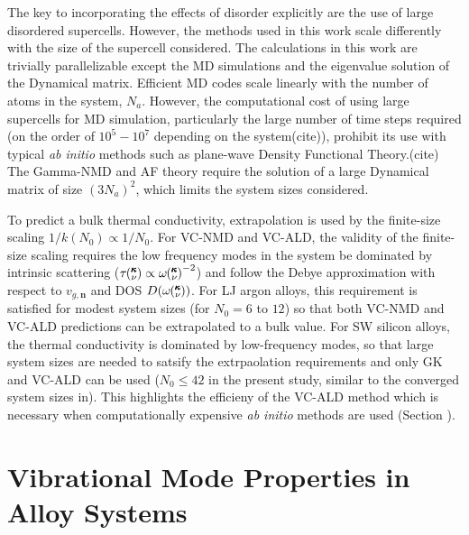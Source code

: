 \documentclass[aps,prb,onecolumn,preprint,superscriptaddress,amsmath,amssymb,floatfix]{revtex4}
\newcommand{\kv}{\mspace{-4.0mu}\left(\mspace{-8.0mu}
\begin{smallmatrix}&\pmb{\kappa} \\&\nu\end{smallmatrix}
\mspace{-3.0mu}\right)}
\begin{document}
The key to incorporating the effects of disorder explicitly are the use 
of large disordered supercells. 
However, the methods used 
in this work scale differently with the size of the supercell considered. 
The calculations in this work are trivially parallelizable\cite{} 
except the 
MD simulations\cite{plimpton_fast_1995} and the eigenvalue solution of the 
Dynamical matrix.\cite{gale_general_2003} Efficient MD 
codes scale linearly with the number of atoms in the system, $N_a$.  
However, the computational cost of using large supercells for MD simulation, 
particularly the large number of time steps required 
(on the order of $10^5 - 10^7$ depending on the 
system(cite)), prohibit its use with typical 
\emph{ab initio} methods such as 
plane-wave Density Functional Theory.(cite) The Gamma-NMD and AF theory 
require the solution of a large Dynamical matrix of size 
$(3N_a)^2$, which limits the system sizes considered. 

To predict a bulk thermal conductivity, extrapolation is used by the 
finite-size scaling $ 1 / k(N_0) \propto 1/N_0$. For VC-NMD and 
VC-ALD, the validity of the finite-size scaling 
requires the low frequency modes in the system be dominated by 
intrinsic scattering ($\tau\kv \propto \omega\kv^{-2}$) and  
follow the Debye approximation 
with respect to $v_{g,\mathbf{n}}$ and DOS $D(\omega\kv)$.
\cite{shiomi_thermal_2011,esfarjani_heat_2011} For LJ 
argon alloys, this requirement is satisfied for modest system sizes 
(for $N_0 = 6$ to $12$) so that both VC-NMD and VC-ALD predictions 
can be extrapolated to a bulk value. 
For SW silicon alloys, the thermal conductivity is dominated by low-frequency 
modes, so that large system sizes are needed to satsify the 
extrpaolation requirements and only GK and VC-ALD can be used 
($N_0 \le 42$ in the present study, 
similar to the converged system sizes in\cite{he_lattice_2012}). This 
highlights the efficieny of the VC-ALD method which is 
necessary when computationally expensive 
\emph{ab initio} methods are used (Section ).
\cite{esfarjani_method_2008,garg_role_2011,tian_phonon_2012,
lindsay_thermal_2012,esfarjani_heat_2011,chaput_phonon-phonon_2011}

\section{\label{S:Vibrational}
Vibrational Mode Properties in Alloy Systems}
\end{document}
